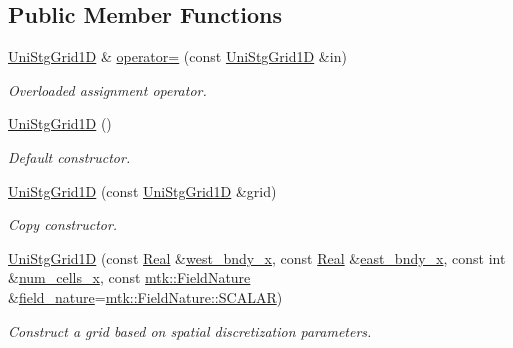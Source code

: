 \subsection*{Public Member Functions}
\begin{DoxyCompactItemize}
\item 
\hyperlink{classmtk_1_1UniStgGrid1D}{Uni\+Stg\+Grid1\+D} \& \hyperlink{classmtk_1_1UniStgGrid1D_aca4208d5e49e2c5c7c88e8919772fb2a}{operator=} (const \hyperlink{classmtk_1_1UniStgGrid1D}{Uni\+Stg\+Grid1\+D} \&in)
\begin{DoxyCompactList}\small\item\em Overloaded assignment operator. \end{DoxyCompactList}\item 
\hyperlink{classmtk_1_1UniStgGrid1D_ab0c1bb8afad2420fdb4434eb21bdec82}{Uni\+Stg\+Grid1\+D} ()
\begin{DoxyCompactList}\small\item\em Default constructor. \end{DoxyCompactList}\item 
\hyperlink{classmtk_1_1UniStgGrid1D_a56d698e803070d96601b46f470bfef0b}{Uni\+Stg\+Grid1\+D} (const \hyperlink{classmtk_1_1UniStgGrid1D}{Uni\+Stg\+Grid1\+D} \&grid)
\begin{DoxyCompactList}\small\item\em Copy constructor. \end{DoxyCompactList}\item 
\hyperlink{classmtk_1_1UniStgGrid1D_a02a40f5c15b0ff4249c1497221dd41ea}{Uni\+Stg\+Grid1\+D} (const \hyperlink{group__c01-roots_gac080bbbf5cbb5502c9f00405f894857d}{Real} \&\hyperlink{classmtk_1_1UniStgGrid1D_afab51be12598704d2dd6d760f826669b}{west\+\_\+bndy\+\_\+x}, const \hyperlink{group__c01-roots_gac080bbbf5cbb5502c9f00405f894857d}{Real} \&\hyperlink{classmtk_1_1UniStgGrid1D_a3b413aeadcc3d3263f6817f3af1dee95}{east\+\_\+bndy\+\_\+x}, const int \&\hyperlink{classmtk_1_1UniStgGrid1D_af1b3729d8afa07be5b2775ed68015b80}{num\+\_\+cells\+\_\+x}, const \hyperlink{group__c02-enums_ga4c54f2a329cfb4e56213b02a259d19e2}{mtk\+::\+Field\+Nature} \&\hyperlink{classmtk_1_1UniStgGrid1D_a6f6a5a23011fe90971ed6b8f5f640cd2}{field\+\_\+nature}=\hyperlink{namespacemtk_ga4c54f2a329cfb4e56213b02a259d19e2a8f3d9a4b6a7b7f2c7afa61ca113d0db9}{mtk\+::\+Field\+Nature\+::\+S\+C\+A\+L\+A\+R})
\begin{DoxyCompactList}\small\item\em Construct a grid based on spatial discretization parameters. \end{DoxyCompactList}\item 

\end{DoxyCompactItemize}
